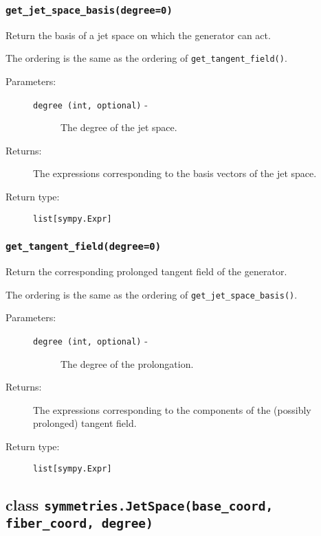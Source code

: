    \subsubsection*{\lstinline{get_jet_space_basis(degree=0)}}

      Return the basis of a jet space on which the generator can act.

      The ordering is the same as the ordering of \lstinline{get_tangent_field()}.

      \begin{description}
         \item[Parameters:] \leavevmode
           \begin{description}
               \item[\lstinline{degree (int, optional)} -] The degree of the jet space.
           \end{description}
         \item[Returns:] The expressions corresponding to the basis vectors of the jet space.
         \item[Return type:] \lstinline{list[sympy.Expr]}
      \end{description}

   \subsubsection*{\lstinline{get_tangent_field(degree=0)}}

      Return the corresponding prolonged tangent field of the
      generator.

      The ordering is the same as the ordering of \lstinline{get_jet_space_basis()}.

      \begin{description}
         \item[Parameters:] \leavevmode
           \begin{description}
               \item[\lstinline{degree (int, optional)} -] The degree of the prolongation.
           \end{description}
         \item[Returns:] The expressions corresponding to the components of the (possibly prolonged) tangent field.
         \item[Return type:] \lstinline{list[sympy.Expr]}
      \end{description}

\subsection*{class \lstinline{symmetries.JetSpace(base_coord, fiber_coord, degree)}}

